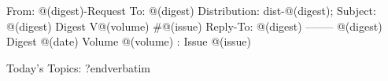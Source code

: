
\verbatim
From:     @(digest)-Request
To:       @(digest) Distribution: dist-@(digest);
Subject:  @(digest) Digest V@(volume) #@(issue)
Reply-To: @(digest)
--------
@(digest) Digest     @(date)      Volume @(volume) : Issue @(issue)

Today's Topics:
?endverbatim
